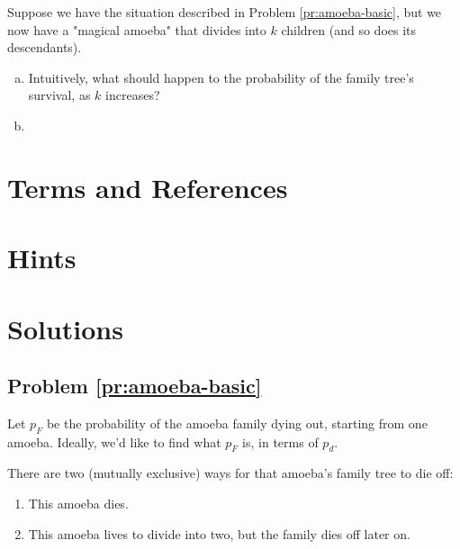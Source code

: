 \begin{problem}
\label{pr:amoeba-caprep}
\end{problem}

\begin{problem}
\label{pr:amoeba-nstart}
\end{problem}

\begin{problem}
\label{pr:amoeba-ndesc}
Suppose we have the situation described in Problem \ref{pr:amoeba-basic}, but we now have a "magical amoeba" that divides into $k$ children (and so does its descendants). 

\begin{enumerate}[(a)]
\item Intuitively, what should happen to the probability of the family tree's survival, as $k$ increases?
\item 
\end{enumerate}
\end{problem}

\newpage
\section{Terms and References}

\section{Hints}

\newpage
\section{Solutions}

\subsection{Problem \ref{pr:amoeba-basic}}

Let $p_F$ be the probability of the amoeba family dying out, starting from one amoeba. Ideally, we'd like to find what $p_F$ is, in terms of $p_d$. 

There are two (mutually exclusive) ways for that amoeba's family tree to die off: 
\begin{enumerate}
\item This amoeba dies.
\item This amoeba lives to divide into two, but the family dies off later on.
\end{enumerate} \hfill

